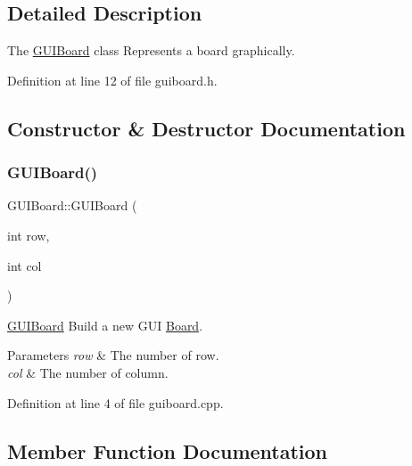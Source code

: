 \subsection{Detailed Description}
The \hyperlink{class_g_u_i_board}{G\+U\+I\+Board} class Represents a board graphically. 

Definition at line 12 of file guiboard.\+h.



\subsection{Constructor \& Destructor Documentation}
\mbox{\label{class_g_u_i_board_a55050277239ca0bd7bfedf36439701ee}} 
\subsubsection{\texorpdfstring{G\+U\+I\+Board()}{GUIBoard()}}
{\footnotesize\ttfamily G\+U\+I\+Board\+::\+G\+U\+I\+Board (\begin{DoxyParamCaption}\item[{int}]{row,  }\item[{int}]{col }\end{DoxyParamCaption})}



\hyperlink{class_g_u_i_board}{G\+U\+I\+Board} Build a new G\+UI \hyperlink{class_board}{Board}. 


\begin{DoxyParams}{Parameters}
{\em row} & The number of row. \\
\hline
{\em col} & The number of column. \\
\hline
\end{DoxyParams}


Definition at line 4 of file guiboard.\+cpp.



\subsection{Member Function Documentation}
\mbox{\label{class_g_u_i_board_a3e2ddf4a20541fed420ad1527e33c68a}} 
